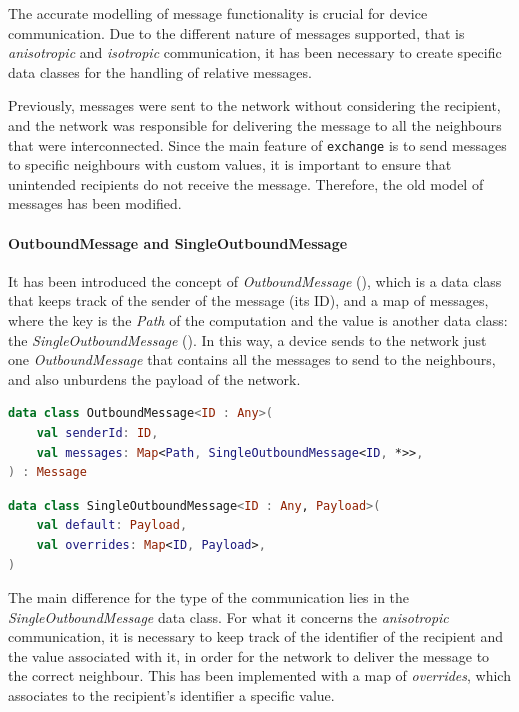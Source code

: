 The accurate modelling of message functionality is crucial for device communication.
Due to the different nature of messages supported, that is \emph{anisotropic} and \emph{isotropic} communication,
it has been necessary to create specific data classes for the handling of relative messages.

Previously, messages were sent to the network without considering the recipient, and the network was responsible for
delivering the message to all the neighbours that were interconnected.
Since the main feature of \texttt{exchange} is to send messages to specific neighbours with custom values, it is important
to ensure that unintended recipients do not receive the message.
Therefore, the old model of messages has been modified.

\paragraph{OutboundMessage and SingleOutboundMessage}
It has been introduced the concept of \emph{OutboundMessage} (), which is a data class that keeps track of the sender of the
message (its ID), and a map of messages, where the key is the \emph{Path} of the computation and the value is another data
class: the \emph{SingleOutboundMessage} ().
In this way, a device sends to the network just one \emph{OutboundMessage} that contains all the messages to send to the neighbours,
and also unburdens the payload of the network.

\begin{lstlisting}[language=kt,label={lst:outbound}, caption={Outbound message data class.}]
data class OutboundMessage<ID : Any>(
    val senderId: ID,
    val messages: Map<Path, SingleOutboundMessage<ID, *>>,
) : Message
\end{lstlisting}

\begin{lstlisting}[language=kt,label={lst:single}, caption={Single outbound message data class.}]
data class SingleOutboundMessage<ID : Any, Payload>(
    val default: Payload,
    val overrides: Map<ID, Payload>,
)
\end{lstlisting}

The main difference for the type of the communication lies in the \emph{SingleOutboundMessage} data class.
For what it concerns the \emph{anisotropic} communication, it is necessary to keep track of the identifier of the recipient
and the value associated with it, in order for the network to deliver the message to the correct neighbour.
This has been implemented with a map of \emph{overrides}, which associates to the recipient's identifier a specific value.

